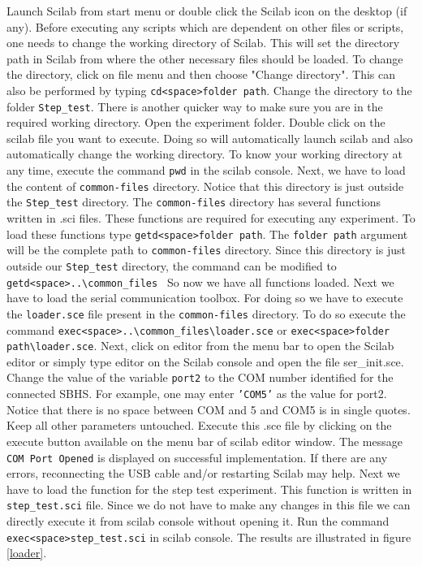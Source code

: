 Launch Scilab from start menu or double click the Scilab icon on the desktop (if any). Before executing any scripts which are dependent on other files or scripts, one needs to change the working directory of Scilab. This will set the directory path in Scilab from where the other necessary files should be loaded.  To change the directory, click on file menu and then choose "Change directory". This can also be performed by typing {\tt cd<space>folder path}. Change the directory to the folder  {\tt Step\_test}. There is another quicker way to make sure you are in the required working directory. Open the experiment folder. Double click on the scilab file you want to execute. Doing so will automatically launch scilab and also automatically change the working directory. To know your working directory at any time, execute the command {\tt pwd} in the scilab console. Next, we have to load the content of {\tt common-files} directory. Notice that this directory is just outside the {\tt Step\_test} directory. The  {\tt common-files} directory has several functions written in .sci files. These functions are required for executing any experiment. To load these functions type {\tt getd<space>folder path}. The {\tt folder path} argument will be the complete path to {\tt common-files} directory. Since this directory is just outside our {\tt Step\_test} directory, the command can be modified to {\tt getd<space>..\textbackslash common\_files\ } So now we have all functions loaded. Next we have to load the serial communication toolbox. For doing so we have to execute the {\tt loader.sce} file present in the {\tt common-files} directory. To do so execute the command {\tt exec<space>..\textbackslash common\_files\textbackslash loader.sce} or {\tt exec<space>folder path\textbackslash loader.sce}. Next, click on {\ttfamily editor} from the menu bar to open the Scilab editor or simply type {\ttfamily editor} on the Scilab console and open the file {\ttfamily ser\_init.sce}. Change the value of the variable {\tt port2} to the COM number identified for the connected SBHS. For example, one may enter {\tt 'COM5'} as the value for port2. Notice that there is no space between COM and 5 and COM5 is in single quotes.  Keep all other parameters untouched. Execute this .sce file by clicking on the execute button available on the menu bar of scilab editor window. The message {\tt COM Port Opened} is displayed on successful implementation. If there are any errors, reconnecting the USB cable and/or restarting Scilab may help. Next we have to load the function for the step test experiment. This function is written in {\tt step\_test.sci} file. Since we do not have to make any changes in this file we can directly execute it from scilab console without opening it. Run the command {\tt exec<space>step\_test.sci} in scilab console.  The results are illustrated in figure \ref{loader}. 

